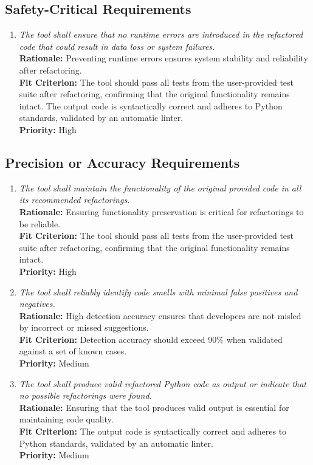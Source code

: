 \documentclass[12pt]{article}
\begin{document}
\subsection{Safety-Critical Requirements}
\begin{enumerate}[label=PR-SCR \arabic*., wide=0pt, leftmargin=*]
    \item \emph{The tool shall ensure that no runtime errors are introduced in the refactored code that could result in data loss or system failures.}\\
    {\bf Rationale:} Preventing runtime errors ensures system stability and reliability after refactoring.\\
    {\bf Fit Criterion:} The tool should pass all tests from the user-provided test suite after refactoring, confirming that the original functionality remains intact. The output code is syntactically correct and adheres to Python standards, validated by an automatic linter.\\
    {\bf Priority:} High
\end{enumerate}
\subsection{Precision or Accuracy Requirements}
\begin{enumerate}[label=PR-PAR \arabic*., wide=0pt, leftmargin=*]
    \item \emph{The tool shall maintain the functionality of the original provided code in all its recommended refactorings.}\\
    {\bf Rationale:} Ensuring functionality preservation is critical for refactorings to be reliable.\\
    {\bf Fit Criterion:} The tool should pass all tests from the user-provided test suite after refactoring, confirming that the original functionality remains intact.\\
    {\bf Priority:} High
    \item \emph{The tool shall reliably identify code smells with minimal false positives and negatives.}\\
    {\bf Rationale:} High detection accuracy ensures that developers are not misled by incorrect or missed suggestions.\\
    {\bf Fit Criterion:} Detection accuracy should exceed 90\% when validated against a set of known cases.\\
    {\bf Priority:} Medium
    \item \emph{The tool shall produce valid refactored Python code as output or indicate that no possible refactorings were found.}\\
    {\bf Rationale:} Ensuring that the tool produces valid output is essential for maintaining code quality.\\
    {\bf Fit Criterion:} The output code is syntactically correct and adheres to Python standards, validated by an automatic linter.\\
    {\bf Priority:} Medium
\end{enumerate}
\end{document}

